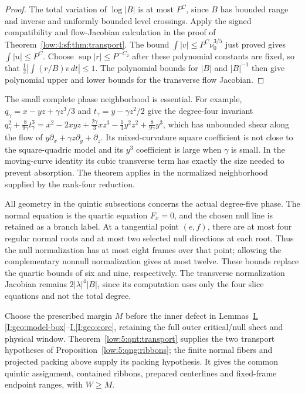 \documentclass[11pt]{amsart}
\theoremstyle{definition}
\theoremstyle{remark}
\numberwithin{equation}{section}
\newcommand{\partIref}[1]{\hyperref[I:#1]{I.\ref*{I:#1}}}
\begin{document}
\begin{proof}
The total variation of $\log|B|$ is at most $P^C$, since $B$ has bounded range and inverse and uniformly bounded level crossings. Apply the signed compatibility and flow-Jacobian calculation in the proof of Theorem~\ref{low:4:sf:thm:transport}. The bound $\int|v|\le P^C\nu_0^{3/5}$ just proved gives $\int|u|\le P^C$. Choose $\sup|r|\le P^{-C_2}$ after these polynomial constants are fixed, so that $\tfrac12\left|\int(r/B)v\,dt\right|\le1$. The polynomial bounds for $|B|$ and $|B|^{-1}$ then give polynomial upper and lower bounds for the transverse flow Jacobian.
\end{proof}

The small complete phase neighborhood is essential. For example, $q_\gamma=x-yz+\gamma z^3/3$ and $t_\gamma=y-\gamma z^2/2$ give the degree-four invariant $q_\gamma^2+\frac{8}{9\gamma}t_\gamma^3=x^2-2xyz+\frac{2\gamma}{3}xz^3-\frac13y^2z^2+\frac{8}{9\gamma}y^3$, which has unbounded shear along the flow of $y\partial_x+\gamma z\partial_y+\partial_z$. Its mixed-curvature square coefficient is not close to the square-quadric model and its $y^3$ coefficient is large when $\gamma$ is small. In the moving-curve identity its cubic transverse term has exactly the size needed to prevent absorption. The theorem applies in the normalized neighborhood supplied by the rank-four reduction.

All geometry in the quintic subsections concerns the actual degree-five phase. The normal equation is the quartic equation $F_x=0$, and the chosen null line is retained as a branch label. At a tangential point $(e,f)$, there are at most four regular normal roots and at most two selected null directions at each root. Thus the null normalization has at most eight frames over that point; allowing the complementary nonnull normalization gives at most twelve. These bounds replace the quartic bounds of six and nine, respectively. The transverse normalization Jacobian remains $2|\lambda|^4|B|$, since its computation uses only the four slice equations and not the total degree.

Choose the prescribed margin $M$ before the inner defect in Lemmas~\partIref{geo:model-box}--\partIref{geo:core}, retaining the full outer critical/null sheet and physical window. Theorem~\ref{low:5:qnt:transport} supplies the two transport hypotheses of Proposition~\ref{low:5:qng:ribbons}; the finite normal fibers and projected packing above supply its packing hypothesis. It gives the common quintic assignment, contained ribbons, prepared centerlines and fixed-frame endpoint ranges, with $W\ge M$.
\end{document}
